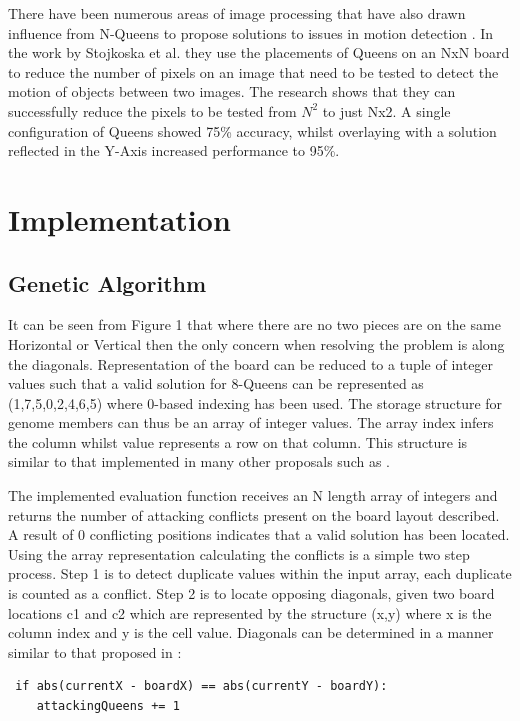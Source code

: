 \documentclass[conference]{IEEEtran}
\begin{document}
There have been numerous areas of image processing that have also drawn influence from N-Queens to propose solutions to issues in motion detection \cite{WSN}. In the work by Stojkoska et al. they use the placements of Queens on an NxN board to reduce the number of pixels on an image that need to be tested to detect the motion of objects between two images. The research shows that they can successfully reduce the pixels to be tested from $N^2$ to just Nx2. A single configuration of Queens showed 75\% accuracy, whilst overlaying with a solution reflected in the Y-Axis increased performance to 95\%.

\section{Implementation}
\subsection{Genetic Algorithm}
It can be seen from Figure 1 that where there are no two pieces are on the same Horizontal or Vertical then the only concern when resolving the problem is along the diagonals. Representation of the board can be reduced to a tuple of integer values such that a valid solution for 8-Queens can be represented as (1,7,5,0,2,4,6,5) where 0-based indexing has been used. The storage structure for genome members can thus be an array of integer values. The array index infers the column whilst value represents a row on that column. This structure is similar to that implemented in many other proposals such as \cite{Performance} \cite{Polynomial}.

The implemented evaluation function receives an N length array of integers and returns the number of attacking conflicts present on the board layout described. A result of 0 conflicting positions indicates that a valid solution has been located. Using the array representation calculating the conflicts is a simple two step process. Step 1 is to detect duplicate values within the input array, each duplicate is counted as a conflict. Step 2 is to locate opposing diagonals, given two board locations c1 and c2 which are represented by the structure (x,y) where x is the column index and y is the cell value. Diagonals can be determined in a manner similar to that proposed in \cite{Adaptive}: 
\begin{lstlisting}
 if abs(currentX - boardX) == abs(currentY - boardY):
	attackingQueens += 1
\end{lstlisting}
\end{document}
